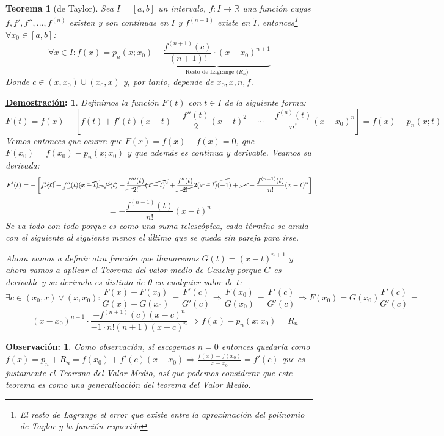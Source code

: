 \documentclass[10pt,a4paper,openright]{book}
\theoremstyle{break}
\newtheorem*{theo}{Teorema}
\newtheorem*{demo}{\underline{Demostración}:}
\newtheorem*{obs}{\underline{Observación}:}
\begin{document}
\begin{theo}[de Taylor]
Sea $I=[a,b]$ un intervalo, $f:I\rightarrow \mathbb R$ una función cuyas $f,f',f'', ..., f^{(n)}$ existen y son continuas en $I$ y $f^{(n+1)}$ existe en $\mathring{I}$, entonces\footnote{El resto de Lagrange el error que existe entre la aproximación del polinomio de Taylor y la función requerida} $\forall x_0 \in [a,b]$:
$$\forall x\in I: f(x)=p_n(x; x_0)+\underbrace{\frac{f^{(n+1)}(c)}{(n+1)!}\cdot (x-x_0)^{n+1}}_{\text{Resto de Lagrange ($R_n$)}}$$
Donde $c\in (x,x_0)\cup (x_0, x)$ y, por tanto, depende de $x_0, x, n, f$.
\end{theo}
\begin{demo}
Definimos la función $F(t)$ con $t\in I$ de la siguiente forma:
$$F(t)=f(x)-\left[f(t)+f'(t)(x-t)+\frac{f''(t)}{2}(x-t)^2+\cdots + \frac{f^{(n)}(t)}{n!}(x-x_0)^n\right]=f(x)-p_n(x;t)$$
Vemos entonces que ocurre que $F(x)=f(x)-f(x)=0$, que $F(x_0)=f(x_0)-p_n(x;x_0)$ y que además es continua y derivable. Veamos su derivada:
$$F'(t)=-\left[\cancel{f'(t)}+\cancel{f''(t)(x-t)}\cancel{-f'(t)}+\cancel{\frac{f'''(t)}{2!}(x-t)^2}+\cancel{\frac{f''(t)}{2!}2(x-t)(-1)}+\cancel{\cdots} +  \frac{f^{(n-1)}(t)}{n!}(x-t)^n\right] $$
$$= -\frac{f^{(n-1)}(t)}{n!}(x-t)^n$$
Se va todo con todo porque es como una suma telescópica, cada término se anula con el siguiente al siguiente menos el último que se queda sin pareja para irse.

Ahora vamos a definir otra función que llamaremos $G(t)=(x-t)^{n+1}$ y ahora vamos a aplicar el Teorema del valor medio de Cauchy porque $G$ es derivable y su derivada es distinta de 0 en cualquier valor de $t$:
$$\exists c \in (x_0,x)\vee (x,x_0): \frac{F(x)-F(x_0)}{G(x)-G(x_0)}=\frac{F'(c)}{G'(c)}\Rightarrow \frac{F(x_0)}{G(x_0)}=\frac{F'(c)}{G'(c)}\Rightarrow F(x_0)=G(x_0)\frac{F'(c)}{G'(c)}=$$
$$=(x-x_0)^{n+1}\cdot \frac{-f^{(n+1)}(c)(x-c)^n}{-1\cdot n!(n+1)(x-c)^n}\Rightarrow f(x)-p_n(x;x_0)=R_n$$
\end{demo}

\begin{obs}
Como observación, si escogemos $n=0$ entonces quedaría como $f(x)=p_n+R_n=f(x_0)+f'(c)(x-x_0)\Rightarrow \frac{f(x)-f(x_0)}{x-x_0}=f'(c)$ que es justamente el Teorema del Valor Medio, así que podemos considerar que este teorema es como una generalización del teorema del Valor Medio.
\end{obs}
\end{document}
